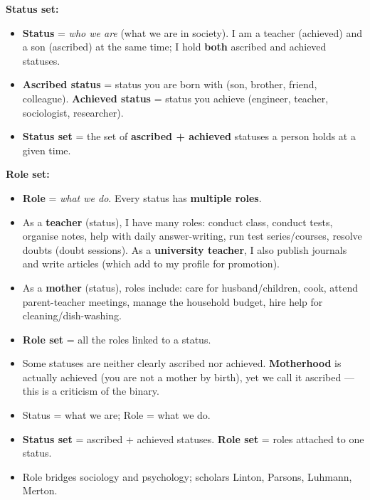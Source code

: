 \begin{KeyConcept}
\textbf{Status set:}
\begin{itemize}
\item \textbf{Status} = \textit{who we are} (what we are in society). I am a teacher (achieved) and a son (ascribed) at the same time; I hold \textbf{both} ascribed and achieved statuses.
\item \textbf{Ascribed status} = status you are born with (son, brother, friend, colleague). \textbf{Achieved status} = status you achieve (engineer, teacher, sociologist, researcher).
\item \textbf{Status set} = the set of \textbf{ascribed + achieved} statuses a person holds at a given time.
\end{itemize}
\end{KeyConcept}

\begin{KeyConcept}
\textbf{Role set:}
\begin{itemize}
\item \textbf{Role} = \textit{what we do}. Every status has \textbf{multiple roles}.
\item As a \textbf{teacher} (status), I have many roles: conduct class, conduct tests, organise notes, help with daily answer-writing, run test series/courses, resolve doubts (doubt sessions). As a \textbf{university teacher}, I also publish journals and write articles (which add to my profile for promotion).
\item As a \textbf{mother} (status), roles include: care for husband/children, cook, attend parent-teacher meetings, manage the household budget, hire help for cleaning/dish-washing.
\item \textbf{Role set} = all the roles linked to a status.
\end{itemize}
\end{KeyConcept}

\begin{CriticalPoint}
\begin{itemize}
\item Some statuses are neither clearly ascribed nor achieved. \textbf{Motherhood} is actually achieved (you are not a mother by birth), yet we call it ascribed --- this is a criticism of the binary.
\end{itemize}
\end{CriticalPoint}

\begin{QuickRevision}
\begin{itemize}
\item Status = what we are; Role = what we do.
\item \textbf{Status set} = ascribed + achieved statuses. \textbf{Role set} = roles attached to one status.
\item Role bridges sociology and psychology; scholars Linton, Parsons, Luhmann, Merton.
\end{itemize}
\end{QuickRevision}

